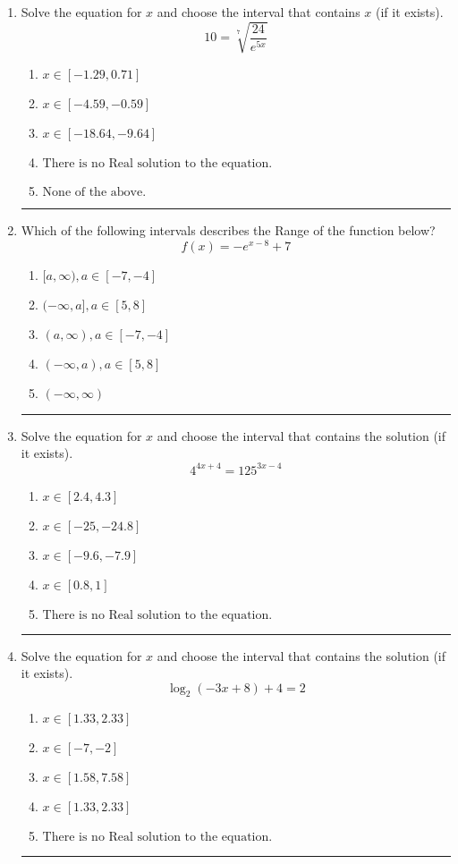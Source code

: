 \documentclass[14pt]{extbook}
\newcommand{\litem}[1]{\item#1\hspace*{-1cm}\rule{\textwidth}{0.4pt}}
\begin{document}
\begin{enumerate}
{\begin{enumerate}[label=\Alph*.]
\end{enumerate} }
\litem{
 Solve the equation for $x$ and choose the interval that contains $x$ (if it exists).\[  10 = \sqrt[7]{\frac{24}{e^{5x}}} \]\begin{enumerate}[label=\Alph*.]
\item \( x \in [-1.29, 0.71] \)
\item \( x \in [-4.59, -0.59] \)
\item \( x \in [-18.64, -9.64] \)
\item \( \text{There is no Real solution to the equation.} \)
\item \( \text{None of the above.} \)

\end{enumerate} }
\litem{
Which of the following intervals describes the Range of the function below?\[ f(x) = -e^{x-8}+7 \]\begin{enumerate}[label=\Alph*.]
\item \( [a, \infty), a \in [-7, -4] \)
\item \( (-\infty, a], a \in [5, 8] \)
\item \( (a, \infty), a \in [-7, -4] \)
\item \( (-\infty, a), a \in [5, 8] \)
\item \( (-\infty, \infty) \)

\end{enumerate} }
\litem{
Solve the equation for $x$ and choose the interval that contains the solution (if it exists).\[ 4^{4x+4} = 125^{3x-4} \]\begin{enumerate}[label=\Alph*.]
\item \( x \in [2.4, 4.3] \)
\item \( x \in [-25, -24.8] \)
\item \( x \in [-9.6, -7.9] \)
\item \( x \in [0.8, 1] \)
\item \( \text{There is no Real solution to the equation.} \)

\end{enumerate} }
\litem{
Solve the equation for $x$ and choose the interval that contains the solution (if it exists).\[ \log_{2}{(-3x+8)}+4 = 2 \]\begin{enumerate}[label=\Alph*.]
\item \( x \in [1.33, 2.33] \)
\item \( x \in [-7, -2] \)
\item \( x \in [1.58, 7.58] \)
\item \( x \in [1.33, 2.33] \)
\item \( \text{There is no Real solution to the equation.} \)


\end{enumerate}}
\end{enumerate}
\end{document}
